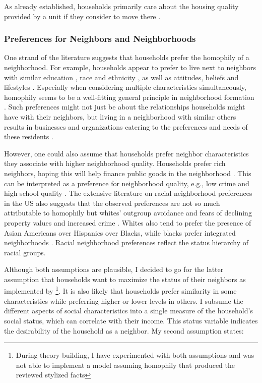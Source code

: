As already established, households primarily care about the housing quality provided by a unit if they consider to move there \citep{chauCriticalReviewLiterature2003, bayerEquilibriumModelSorting2004, mummoloWhyPartisansNot2017, delucaNotJustLateral2020}.


\subsubsection{Preferences for Neighbors and Neighborhoods}

One strand of the literature suggests that households prefer the homophily of a neighborhood. For example, households appear to prefer to live next to neighbors with similar education \citep{bayerUnifiedFrameworkMeasuring2007, bruchChoiceSetFormation2019}, race and ethnicity \citep{krysanDoesRaceMatter2009, bruchChoiceSetFormation2019}, as well as attitudes, beliefs and lifestyles \citep{mummoloWhyPartisansNot2017}. Especially when considering multiple characteristics simultaneously, homophily seems to be a well-fitting general principle in neighborhood formation \citep{loganBirdsFeatherSocial2016}. Such preferences might not just be about the relationships households might have with their neighbors, but living in a neighborhood with similar others results in businesses and organizations catering to the preferences and needs of these residents \citep{bruecknerWhyCentralParis1999}.

However, one could also assume that households prefer neighbor characteristics they associate with higher neighborhood quality. Households prefer rich neighbors, hoping this will help finance public goods in the neighborhood \citep{bayerUnifiedFrameworkMeasuring2007, bruchChoiceSetFormation2019}. This can be interpreted as a preference for neighborhood quality, e.g., low crime and high school quality \citep{bayerUnifiedFrameworkMeasuring2007, mummoloWhyPartisansNot2017}. The extensive literature on racial neighborhood preferences in the US also suggests that the observed preferences are not so much attributable to homophily but whites' outgroup avoidance and fears of declining property values and increased crime \citep{krysanDoesRaceMatter2009}. Whites also tend to prefer the presence of Asian Americans over Hispanics over Blacks, while blacks prefer integrated neighborhoods \citep{charlesDynamicsRacialResidential2003}. Racial neighborhood preferences reflect the status hierarchy of racial groups.

Although both assumptions are plausible, I decided to go for the latter assumption that households want to maximize the status of their neighbors as implemented by \citet{benardWealthStatusBasedModel2007}\footnote{During theory-building, I have experimented with both assumptions and was not able to implement a model assuming homophily that produced the reviewed stylized facts}. It is also likely that households prefer similarity in some characteristics while preferring higher or lower levels in others. I subsume the different aspects of social characteristics into a single measure of the household's social status, which can correlate with their income. This status variable indicates the desirability of the household as a neighbor. My second assumption states:

